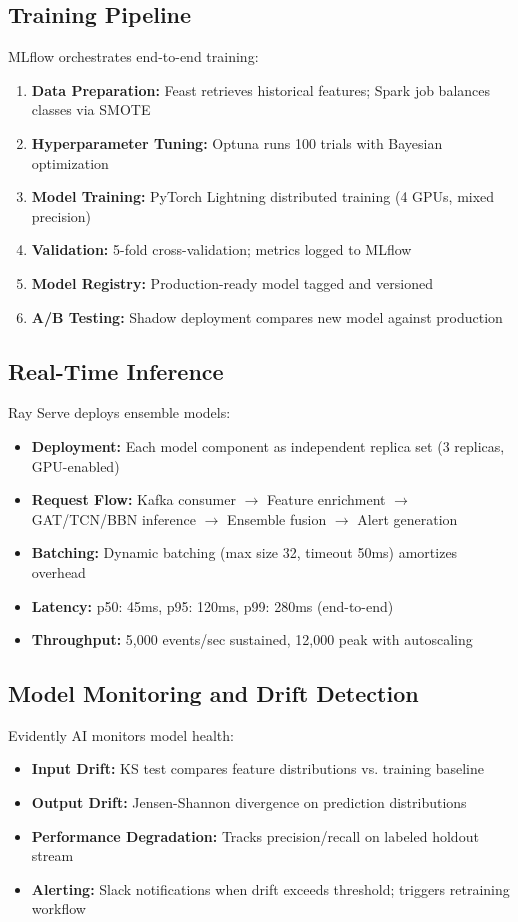 \subsection{Training Pipeline}
MLflow orchestrates end-to-end training:
\begin{enumerate}
    \item \textbf{Data Preparation:} Feast retrieves historical features; Spark job balances classes via SMOTE
    \item \textbf{Hyperparameter Tuning:} Optuna runs 100 trials with Bayesian optimization
    \item \textbf{Model Training:} PyTorch Lightning distributed training (4 GPUs, mixed precision)
    \item \textbf{Validation:} 5-fold cross-validation; metrics logged to MLflow
    \item \textbf{Model Registry:} Production-ready model tagged and versioned
    \item \textbf{A/B Testing:} Shadow deployment compares new model against production
\end{enumerate}

\subsection{Real-Time Inference}
Ray Serve deploys ensemble models:
\begin{itemize}
    \item \textbf{Deployment:} Each model component as independent replica set (3 replicas, GPU-enabled)
    \item \textbf{Request Flow:} Kafka consumer $\rightarrow$ Feature enrichment $\rightarrow$ GAT/TCN/BBN inference $\rightarrow$ Ensemble fusion $\rightarrow$ Alert generation
    \item \textbf{Batching:} Dynamic batching (max size 32, timeout 50ms) amortizes overhead
    \item \textbf{Latency:} p50: 45ms, p95: 120ms, p99: 280ms (end-to-end)
    \item \textbf{Throughput:} 5,000 events/sec sustained, 12,000 peak with autoscaling
\end{itemize}

\subsection{Model Monitoring and Drift Detection}
Evidently AI monitors model health:
\begin{itemize}
    \item \textbf{Input Drift:} KS test compares feature distributions vs. training baseline
    \item \textbf{Output Drift:} Jensen-Shannon divergence on prediction distributions
    \item \textbf{Performance Degradation:} Tracks precision/recall on labeled holdout stream
    \item \textbf{Alerting:} Slack notifications when drift exceeds threshold; triggers retraining workflow
\end{itemize}

